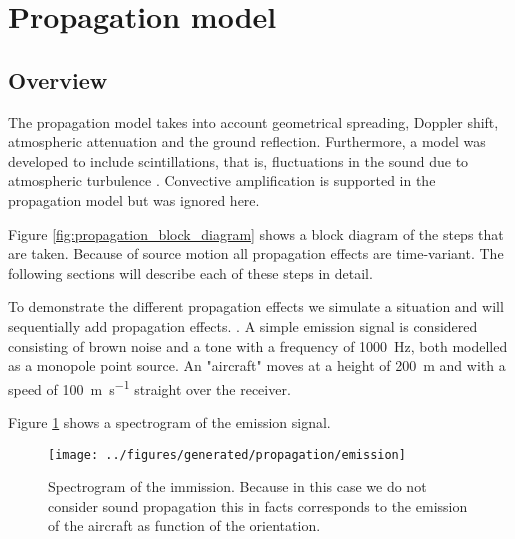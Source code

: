 \section{Propagation model}

\subsection{Overview}
The propagation model takes into account geometrical spreading, Doppler shift,
atmospheric attenuation and the ground reflection. Furthermore, a model was
developed to include scintillations, that is, fluctuations in the sound due to atmospheric
turbulence \cite{Rietdijk2017}. Convective amplification is supported in the
propagation model but was ignored here.

Figure \ref{fig:propagation_block_diagram} shows a block diagram of the steps
that are taken. Because of source motion all propagation effects are
time-variant. The following sections will describe each of these steps in
detail.

To demonstrate the different propagation effects we simulate a situation and
will sequentially add propagation effects. . A simple
emission signal is considered consisting of brown noise and a tone with a
frequency of \SI{1000}{\hertz}, both modelled as a monopole point source. An
"aircraft" moves at a height of \SI{200}{\meter} and with a speed of
\SI{100}{\meter\per\second} straight over the receiver.

Figure \ref{fig:implementation:propagation:emission} shows a spectrogram of the
emission signal.

\begin{figure}[H]
  \centering
  \texttt{[image: ../figures/generated/propagation/emission]}
  \caption{Spectrogram of the immission. Because in this case we do not consider sound propagation this in facts corresponds to the emission of the aircraft as function of the orientation.}
  \label{fig:implementation:propagation:emission}
\end{figure}

